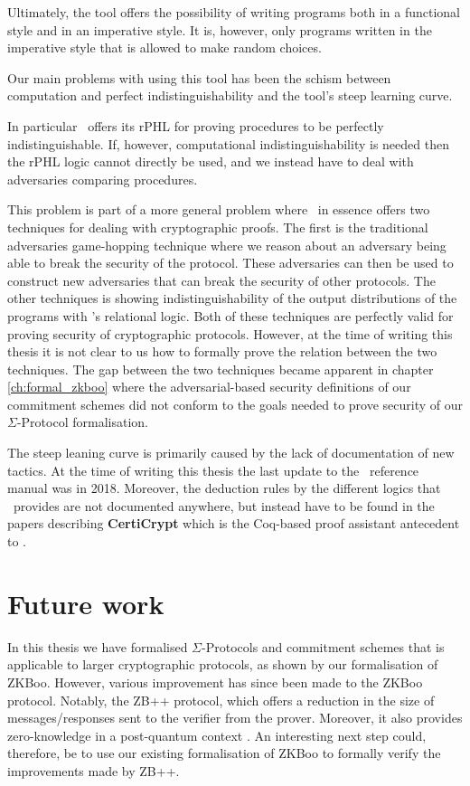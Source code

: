 Ultimately, the tool offers the possibility of writing programs both in a
functional style and in an imperative style. It is, however, only programs
written in the imperative style that is allowed to make random choices.

Our main problems with using this tool has been the schism between computation
and perfect indistinguishability and the tool's steep learning curve.

In particular \easycrypt\ offers its rPHL for proving procedures to be perfectly
indistinguishable. If, however, computational indistinguishability is needed then
the rPHL logic cannot directly be used, and we instead have to deal with
adversaries comparing procedures.

This problem is part of a more general problem where \easycrypt\ in essence
offers two techniques for dealing with cryptographic proofs. The first is the
traditional adversaries game-hopping technique where we reason about an
adversary being able to break the security of the protocol. These adversaries can
then be used to construct new adversaries that can break the security of other protocols.
The other techniques is showing indistinguishability of the output distributions
of the programs with \easycrypt's relational logic.
Both of these techniques are perfectly valid for proving security of
cryptographic protocols. However, at the time of writing this thesis it is not
clear to us how to formally prove the relation between the two techniques.
The gap between the two techniques became apparent in chapter \ref{ch:formal_zkboo} where the
adversarial-based security definitions of our commitment schemes did not conform
to the goals needed to prove security of our $\Sigma$-Protocol formalisation.

The steep leaning curve is primarily caused by the lack of documentation of new
tactics. At the time of writing this thesis the last update to the \easycrypt\
reference manual \cite{ec_refman} was in 2018. Moreover, the deduction rules by
the different logics that \easycrypt\ provides are not documented anywhere, but
instead have to be found in the papers describing \textbf{CertiCrypt} which is
the Coq-based proof assistant antecedent to \easycrypt.

\section{Future work}
\label{sec:future_work}
In this thesis we have formalised $\Sigma$-Protocols and
commitment schemes that is applicable to larger cryptographic protocols, as shown
by our formalisation of ZKBoo. However, various improvement has since been made to the
ZKBoo protocol. Notably, the ZB++ protocol, which offers a reduction in the
size of messages/responses sent to the verifier from the prover. Moreover, it also provides zero-knowledge
in a post-quantum context \cite{zkb++}. An interesting next step could,
therefore, be to use our existing formalisation of ZKBoo to formally verify the
improvements made by ZB++.

